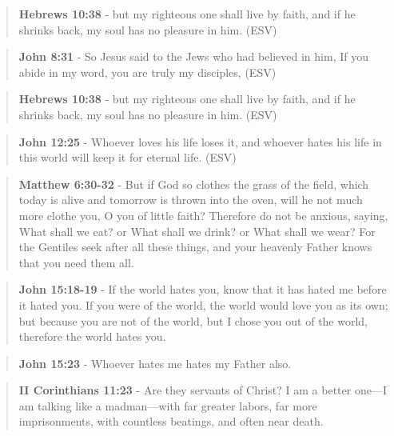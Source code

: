 \documentclass[11pt]{article}
\begin{document}
\begin{quote}
\textbf{Hebrews 10:38} - but my righteous one shall live by faith, and if he shrinks back, my soul has no pleasure in him. (ESV)
\end{quote}

\begin{quote}
\textbf{John 8:31} - So Jesus said to the Jews who had believed in him, If you abide in my word, you are truly my disciples, (ESV)
\end{quote}

\begin{quote}
\textbf{Hebrews 10:38} - but my righteous one shall live by faith, and if he shrinks back, my soul has no pleasure in him. (ESV)
\end{quote}

\begin{quote}
\textbf{John 12:25} -  Whoever loves his life loses it, and whoever hates his life in this world will keep it for eternal life.  (ESV)
\end{quote}

\begin{quote}
\textbf{Matthew 6:30-32} - But if God so clothes the grass of the field, which today is alive and tomorrow is thrown into the oven, will he not much more clothe you, O you of little faith? Therefore do not be anxious, saying, What shall we eat? or What shall we drink? or What shall we wear? For the Gentiles seek after all these things, and your heavenly Father knows that you need them all.
\end{quote}

\begin{quote}
\textbf{John 15:18-19} - If the world hates you, know that it has hated me before it hated you. If you were of the world, the world would love you as its own; but because you are not of the world, but I chose you out of the world, therefore the world hates you.
\end{quote}

\begin{quote}
\textbf{John 15:23} - Whoever hates me hates my Father also.
\end{quote}

\begin{quote}
\textbf{II Corinthians 11:23} - Are they servants of Christ? I am a better one—I am talking like a madman—with far greater labors, far more imprisonments, with countless beatings, and often near death.
\end{quote}
\end{document}
